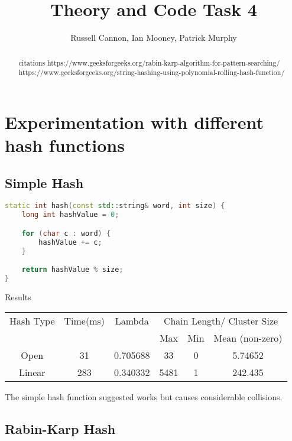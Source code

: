 \documentclass[12pt]{article}
\begin{document}
\title{Theory and Code Task 4}
\author{Russell Cannon, Ian Mooney, Patrick Murphy}

\maketitle
\singlespacing

\begin{abstract}
\begin{center}
citations
https://www.geeksforgeeks.org/rabin-karp-algorithm-for-pattern-searching/
https://www.geeksforgeeks.org/string-hashing-using-polynomial-rolling-hash-function/
\end{center}
\end{abstract}

\newpage

\section{Experimentation with different hash functions}
\subsection{Simple Hash}
\begin{lstlisting}[language=C++]
static int hash(const std::string& word, int size) {
    long int hashValue = 0;

    for (char c : word) {
        hashValue += c;
    }

    return hashValue % size;
}
\end{lstlisting}

\begin{center}
Results\\
\begin{tabular}{|c|c|c|c|c|c|}
\hline
Hash Type & Time(ms) & Lambda & \multicolumn{3}{|c|}{Chain Length/ Cluster Size} \\
 & & & Max & Min & Mean (non-zero) \\
\hline
Open & 31 & 0.705688 & 33 & 0 & 5.74652\\
Linear & 283 & 0.340332 & 5481 & 1 & 242.435\\
\hline
\end{tabular}
\end{center}

The simple hash function suggested works but causes considerable collisions.

\subsection{Rabin-Karp Hash}
\end{document}
